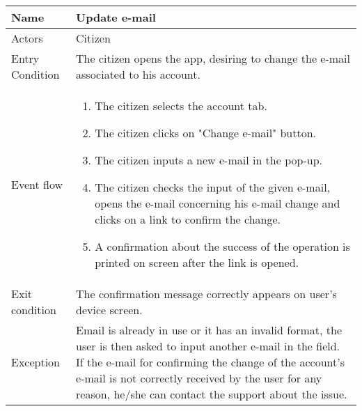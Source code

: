 \vskip 0.2in
\begin{tabular}{|p{3.1cm}|p{11.6cm}|}
	\hline
	Name & Update e-mail\\
	\hline
	Actors & Citizen\\
	\hline
	Entry Condition & The citizen opens the app, desiring to change the e-mail associated to his account.\\
	\hline
	Event flow & \begin{enumerate}
		\item The citizen selects the account tab.
		\item The citizen clicks on "Change e-mail" button.
		\item The citizen inputs a new e-mail in the pop-up.
		\item The citizen checks the input of the given e-mail, opens the e-mail concerning his e-mail change and clicks on a link to confirm the change.
		\item A confirmation about the success of the operation is printed on screen after the link is opened.
	\end{enumerate}\\
	\hline
	Exit condition & The confirmation message correctly appears on user's device screen.\\
	\hline
	Exception & Email is already in use or it has an invalid format, the user is then asked to input another e-mail in the field. If the e-mail for confirming the change of the account's e-mail is not correctly received by the user for any reason, he/she can contact the support about the issue.\\
	\hline
\end{tabular}
